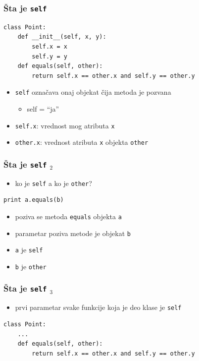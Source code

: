 \documentclass[utf8,compress]{beamer}
\begin{document}
\begin{frame}[fragile]
  \frametitle{Šta je \texttt{self}}
\begin{verbatim}
class Point:
    def __init__(self, x, y):
        self.x = x
        self.y = y
    def equals(self, other):
        return self.x == other.x and self.y == other.y
\end{verbatim}
  \begin{itemize}
    \item \texttt{self} označava onaj objekat čija metoda je pozvana
    \begin{itemize}
      \item self = ``ja''
    \end{itemize}
    \item \texttt{self.x}: vrednost mog atributa \texttt{x}
    \item \texttt{other.x}: vrednost atributa \texttt{x} objekta \texttt{other}
  \end{itemize}
\end{frame}

\begin{frame}[fragile]
  \frametitle{Šta je \texttt{self} $_2$}
  \begin{itemize}
    \item ko je \texttt{self} a ko je \texttt{other}?
  \end{itemize}
\begin{verbatim}
print a.equals(b)    
\end{verbatim}
  \begin{itemize}
    \item poziva se metoda \texttt{equals} objekta \texttt{a}
    \item parametar poziva metode je objekat \texttt{b}
    \item \texttt{a} je \texttt{self}
    \item \texttt{b} je \texttt{other}
  \end{itemize}
\end{frame}

\begin{frame}[fragile]
  \frametitle{Šta je \texttt{self} $_3$}
  \begin{itemize}
    \item prvi parametar svake funkcije koja je deo klase je \texttt{self}
  \end{itemize}
\begin{verbatim}
class Point:
    ...
    def equals(self, other):
        return self.x == other.x and self.y == other.y
\end{verbatim}
\end{frame}
\end{document}
